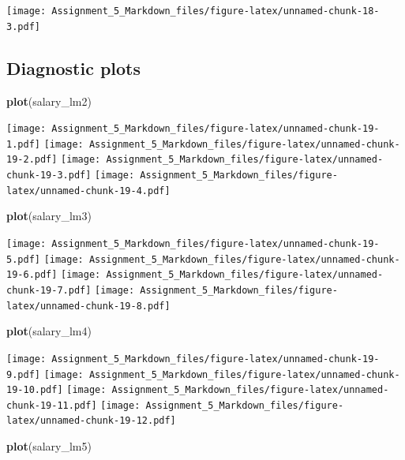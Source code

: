 \documentclass[]{article}
\newenvironment{Shaded}{\begin{snugshade}}{\end{snugshade}}
\newcommand{\KeywordTok}[1]{\textcolor[rgb]{0.13,0.29,0.53}{\textbf{#1}}}
\newcommand{\NormalTok}[1]{#1}
\begin{document}
\texttt{[image: Assignment\_5\_Markdown\_files/figure-latex/unnamed-chunk-18-3.pdf]}

\subsection{Diagnostic plots}\label{diagnostic-plots}

\begin{Shaded}
\begin{Highlighting}[]
\KeywordTok{plot}\NormalTok{(salary_lm2)}
\end{Highlighting}
\end{Shaded}

\texttt{[image: Assignment\_5\_Markdown\_files/figure-latex/unnamed-chunk-19-1.pdf]}
\texttt{[image: Assignment\_5\_Markdown\_files/figure-latex/unnamed-chunk-19-2.pdf]}
\texttt{[image: Assignment\_5\_Markdown\_files/figure-latex/unnamed-chunk-19-3.pdf]}
\texttt{[image: Assignment\_5\_Markdown\_files/figure-latex/unnamed-chunk-19-4.pdf]}

\begin{Shaded}
\begin{Highlighting}[]
\KeywordTok{plot}\NormalTok{(salary_lm3)}
\end{Highlighting}
\end{Shaded}

\texttt{[image: Assignment\_5\_Markdown\_files/figure-latex/unnamed-chunk-19-5.pdf]}
\texttt{[image: Assignment\_5\_Markdown\_files/figure-latex/unnamed-chunk-19-6.pdf]}
\texttt{[image: Assignment\_5\_Markdown\_files/figure-latex/unnamed-chunk-19-7.pdf]}
\texttt{[image: Assignment\_5\_Markdown\_files/figure-latex/unnamed-chunk-19-8.pdf]}

\begin{Shaded}
\begin{Highlighting}[]
\KeywordTok{plot}\NormalTok{(salary_lm4)}
\end{Highlighting}
\end{Shaded}

\texttt{[image: Assignment\_5\_Markdown\_files/figure-latex/unnamed-chunk-19-9.pdf]}
\texttt{[image: Assignment\_5\_Markdown\_files/figure-latex/unnamed-chunk-19-10.pdf]}
\texttt{[image: Assignment\_5\_Markdown\_files/figure-latex/unnamed-chunk-19-11.pdf]}
\texttt{[image: Assignment\_5\_Markdown\_files/figure-latex/unnamed-chunk-19-12.pdf]}

\begin{Shaded}
\begin{Highlighting}[]
\KeywordTok{plot}\NormalTok{(salary_lm5)}
\end{Highlighting}
\end{Shaded}
\end{document}
